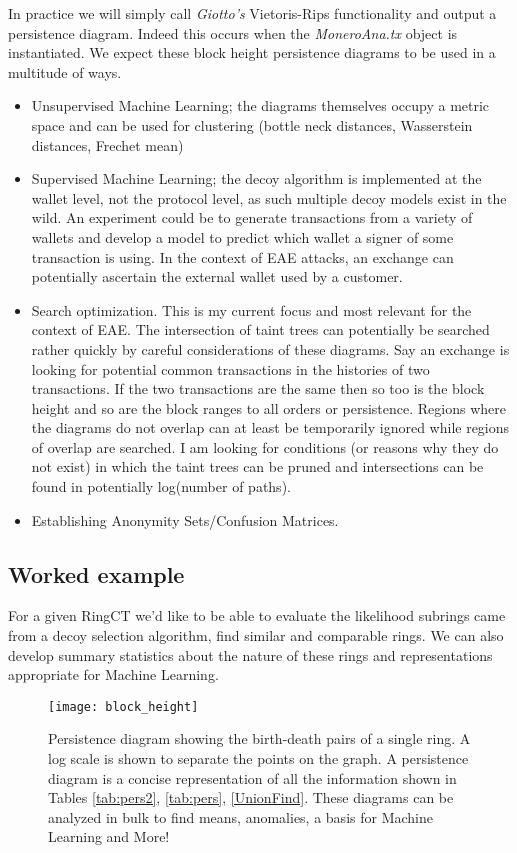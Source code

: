 In practice we will simply call \textit{Giotto's} Vietoris-Rips functionality and output a persistence diagram.  Indeed this occurs when the \textit{MoneroAna.tx} object is instantiated.  We expect these block height persistence diagrams to be used in a multitude of ways.  
\begin{itemize}
\item Unsupervised Machine Learning; the diagrams themselves occupy a metric space and can be used for clustering (bottle neck distances, Wasserstein distances, Frechet mean)
\item Supervised Machine Learning; the decoy algorithm is implemented at the wallet level, not the protocol level, as such multiple decoy models exist in the wild.  An experiment could be to generate transactions from a variety of wallets and develop a model to predict which wallet a signer of some transaction is using.  In the context of EAE attacks, an exchange can potentially ascertain the external wallet used by a customer.
\item Search optimization.  This is my current focus and most relevant for the context of EAE.  The intersection of taint trees can potentially be searched rather quickly by careful considerations of these diagrams.  Say an exchange is looking for potential common transactions in the histories of two transactions.  If the two transactions are the same then so too is the block height and so are the block ranges to all orders or persistence.  Regions where the diagrams do not overlap can at least be temporarily ignored while regions of overlap are searched.  I am looking for conditions (or reasons why they do not exist) in which the taint trees can be pruned and intersections can be found in potentially log(number of paths).
\item Establishing Anonymity Sets/Confusion Matrices.

\end{itemize}

\subsection{Worked example}

For a given RingCT we'd like to be able to evaluate the likelihood subrings came from a decoy selection algorithm, find similar and comparable rings.  
We can also develop summary statistics about the nature of these rings and representations appropriate for Machine Learning.   

\begin{figure}[h]
\texttt{[image: block\_height]}
\caption{Persistence diagram showing the birth-death pairs of a single ring.  A log scale is shown to separate the points on the graph.  A persistence diagram is a concise representation of all the information shown in Tables \ref{tab:pers2}, \ref{tab:pers}, \ref{UnionFind}.  These diagrams can be analyzed in bulk to find means, anomalies, a basis for Machine Learning and More!}
\label{fig:alpha}
\end{figure}

